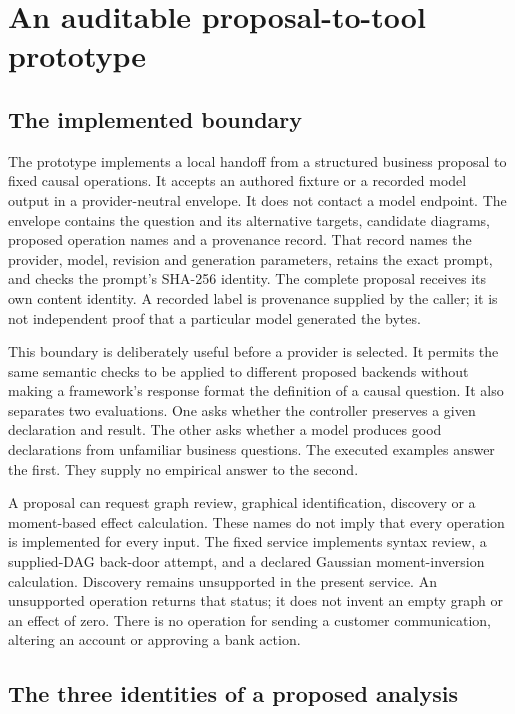\chapter{An auditable proposal-to-tool prototype}
\label{ch:la05-prototype}

\section{The implemented boundary}

The prototype implements a local handoff from a structured business proposal to
fixed causal operations. It accepts an authored fixture or a recorded model
output in a provider-neutral envelope. It does not contact a model endpoint.
The envelope contains the question and its alternative targets, candidate
diagrams, proposed operation names and a provenance record. That record names
the provider, model, revision and generation parameters, retains the exact
prompt, and checks the prompt's SHA-256 identity. The complete proposal receives
its own content identity. A recorded label is provenance supplied by the caller;
it is not independent proof that a particular model generated the bytes.

This boundary is deliberately useful before a provider is selected. It permits
the same semantic checks to be applied to different proposed backends without
making a framework's response format the definition of a causal question.
It also separates two evaluations. One asks whether the controller preserves a
given declaration and result. The other asks whether a model produces good
declarations from unfamiliar business questions. The executed examples answer
the first. They supply no empirical answer to the second.

A proposal can request graph review, graphical identification, discovery or a
moment-based effect calculation. These names do not imply that every operation
is implemented for every input. The fixed service implements syntax review,
a supplied-DAG back-door attempt, and a declared Gaussian moment-inversion
calculation. Discovery remains unsupported in the present service. An unsupported
operation returns that status; it does not invent an empty graph or an effect
of zero. There is no operation for sending a customer communication, altering
an account or approving a bank action.

\section{The three identities of a proposed analysis}

